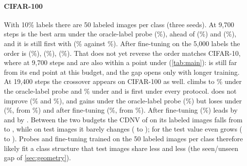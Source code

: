 \paragraph{CIFAR-100}
With 10\% labels there are 50 labeled images per class (three seeds). At 9,700 steps \union is the best arm
under the oracle-label probe (\%), ahead of \simclr
(\%) and \supcon (\%), and it is still first with
\lpfive (\% against \%). After fine-tuning on the 5,000
labels the order is \simclr (\%), \union (\%), \supcon
(\%). That \lpfive does not yet reverse the order matches CIFAR-10, where at
9,700 steps \simclr and \union are also within a point under \lpfive (\cref{tab:main}): \simclr is still far
from its end point at this budget, and the gap opens only with longer training. At 19,400 steps the crossover
appears on CIFAR-100 as well. \simclr climbs to \% under the oracle-label probe
and \% under \lpfive and is first under every protocol. \supcon does not improve
(\% and \%), and \union gains under the
oracle-label probe (\%) but loses under \lpfive (\%, from
\%) and after fine-tuning (\%, from
\%). After fine-tuning \simclr (\%) leads \supcon by
\pt and \union by \pt. Between the two budgets the CDNV of
\union on its labeled images falls from  to , while on
test images it barely changes ( to ); for \supcon the
test value even grows ( to ). Probes and
fine-tuning trained on the 50 labeled images per class therefore likely fit a class structure that test
images share less and less (the seen/unseen gap of \cref{sec:geometry}).

